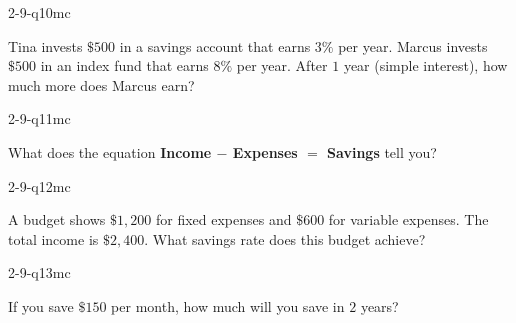 \begin{practiceQuestion}{2-9-q10}{mc}
\begin{questionText}
Tina invests $\$500$ in a savings account that earns $3\%$ per year. Marcus invests $\$500$ in an index fund that earns $8\%$ per year. After $1$ year (simple interest), how much more does Marcus earn?
\end{questionText}
\end{practiceQuestion}

\begin{practiceQuestion}{2-9-q11}{mc}
\begin{questionText}
What does the equation \textbf{Income $-$ Expenses $=$ Savings} tell you?
\end{questionText}
\end{practiceQuestion}

\begin{practiceQuestion}{2-9-q12}{mc}
\begin{questionText}
A budget shows $\$1{,}200$ for fixed expenses and $\$600$ for variable expenses. The total income is $\$2{,}400$. What savings rate does this budget achieve?
\end{questionText}
\end{practiceQuestion}

\begin{practiceQuestion}{2-9-q13}{mc}
\begin{questionText}
If you save $\$150$ per month, how much will you save in $2$ years?
\end{questionText}
\end{practiceQuestion}

